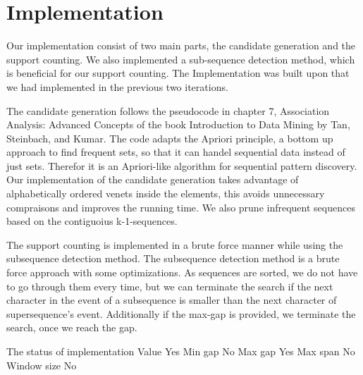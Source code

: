 \section{Implementation}

Our implementation consist of two main parts, the candidate generation and the support counting. 
We also implemented a sub-sequence detection method, which is beneficial for our support counting. 
The Implementation was built upon that we had implemented in the previous two iterations.
\newline

The candidate generation follows the pseudocode in chapter 7, Association Analysis: Advanced Concepts of the book Introduction to Data Mining by Tan, Steinbach, and Kumar. 
The code adapts the Apriori principle, a bottom up approach to find frequent sets, so that it  can handel sequential data instead of just sets. Therefor it is an Apriori-like algorithm for sequential pattern discovery.
Our implementation of the candidate generation takes advantage of alphabetically ordered venets inside the elements, this avoids unnecessary compraisons and  improves the running time. We also prune infrequent sequences based on the contiguoius {k-1}-sequences.
\newline

The support counting is implemented in a brute force manner while using the subsequence detection method. 
The subsequence detection method is a brute force approach with some optimizations. 
As sequences are sorted, we do not have to go through them every time, but we can terminate the search if the next 
character in the event of a subsequence is smaller than the next character of supersequence’s event. 
Additionally if the max-gap is provided, we terminate the search, once we reach the gap.
\newline

The status of implementation
Value	Yes
Min gap	No
Max gap	Yes
Max span	No
Window size	No

